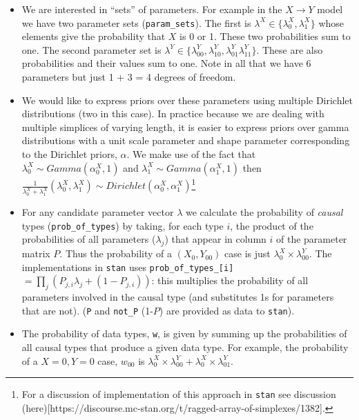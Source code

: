 \documentclass[
  11pt,
  article]{jss}
\begin{document}
\begin{itemize}
\item
  We are interested in ``sets'' of parameters. For example in the
  \(X \rightarrow Y\) model we have two parameter sets
  (\texttt{param\_sets}). The first is
  \(\lambda^X \in \{\lambda^X_0, \lambda^X_1\}\) whose elements give the
  probability that \(X\) is 0 or 1. These two probabilities sum to one.
  The second parameter set is
  \(\lambda^Y \in \{\lambda^Y_{00}, \lambda^Y_{10}, \lambda^Y_{01} \lambda^Y_{11}\}\).
  These are also probabilities and their values sum to one. Note in all
  that we have 6 parameters but just 1 + 3 = 4 degrees of freedom.
\item
  We would like to express priors over these parameters using multiple
  Dirichlet distributions (two in this case). In practice because we are
  dealing with multiple simplices of varying length, it is easier to
  express priors over gamma distributions with a unit scale parameter
  and shape parameter corresponding to the Dirichlet priors, \(\alpha\).
  We make use of the fact that \(\lambda^X_0 \sim Gamma(\alpha^X_0,1)\)
  and \(\lambda^X_1 \sim Gamma(\alpha^X_1,1)\) then
  \(\frac{1}{\lambda^X_0 +\lambda^X_1}(\lambda^X_0, \lambda^X_1) \sim Dirichlet(\alpha^X_0, \alpha^X_1)\)\footnote{For
    a discussion of implementation of this approach in \texttt{stan} see
    discussion
    (here){[}https://discourse.mc-stan.org/t/ragged-array-of-simplexes/1382{]}.}
\item
  For any candidate parameter vector \(\lambda\) we calculate the
  probability of \emph{causal} types (\texttt{prob\_of\_types}) by
  taking, for each type \(i\), the product of the probabilities of all
  parameters (\(\lambda_j\)) that appear in column \(i\) of the
  parameter matrix \(P\). Thus the probability of a \((X_0,Y_{00})\)
  case is just \(\lambda^X_0 \times \lambda^Y_{00}\). The
  implementations in \texttt{stan} uses
  \texttt{prob\_of\_types\_{[}i{]}}
  \(= \prod_j \left(P_{j,i} \lambda_j + (1-P_{j,i})\right)\): this
  multiplies the probability of all parameters involved in the causal
  type (and substitutes 1s for parameters that are not). (\texttt{P} and
  \texttt{not\_P} (1-\(P\)) are provided as data to \texttt{stan}).
\item
  The probability of data types, \texttt{w}, is given by summing up the
  probabilities of all causal types that produce a given data type. For
  example, the probability of a \(X=0,Y=0\) case, \(w_{00}\) is
  \(\lambda^X_0\times \lambda^Y_{00} + \lambda^X_0\times \lambda^Y_{01}\).

\end{itemize}
\end{document}
